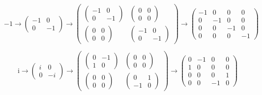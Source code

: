 \documentclass[
]{book}
\theoremstyle{definition}
\theoremstyle{definition}
\theoremstyle{definition}
\theoremstyle{definition}
\theoremstyle{remark}
\begin{document}
\[
-1\rightarrow\begin{pmatrix}-1 & 0\\
0 & -1
\end{pmatrix}\rightarrow\begin{pmatrix}\begin{pmatrix}-1 & 0\\
0 & -1
\end{pmatrix} & \begin{pmatrix}0 & 0\\
0 & 0
\end{pmatrix}\\
\begin{pmatrix}0 & 0\\
0 & 0
\end{pmatrix} & \begin{pmatrix}-1 & 0\\
0 & -1
\end{pmatrix}
\end{pmatrix}\rightarrow\begin{pmatrix}-1 & 0 & 0 & 0\\
0 & -1 & 0 & 0\\
0 & 0 & -1 & 0\\
0 & 0 & 0 & -1
\end{pmatrix}
\]

\[
\mathrm{i}\rightarrow\begin{pmatrix}i & 0\\
0 & -i
\end{pmatrix}\rightarrow\begin{pmatrix}\begin{pmatrix}0 & -1\\
1 & 0
\end{pmatrix} & \begin{pmatrix}0 & 0\\
0 & 0
\end{pmatrix}\\
\begin{pmatrix}0 & 0\\
0 & 0
\end{pmatrix} & \begin{pmatrix}0 & 1\\
-1 & 0
\end{pmatrix}
\end{pmatrix}\rightarrow\begin{pmatrix}0 & -1 & 0 & 0\\
1 & 0 & 0 & 0\\
0 & 0 & 0 & 1\\
0 & 0 & -1 & 0
\end{pmatrix}
\]
\end{document}
